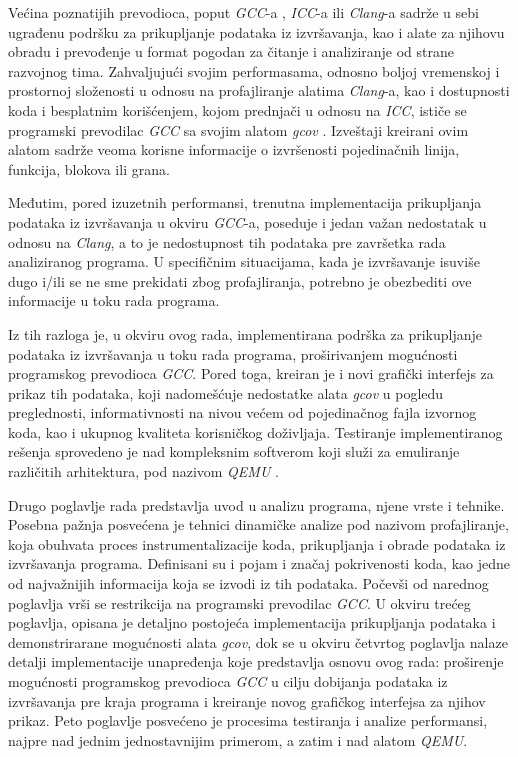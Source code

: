 \documentclass[12pt,oneside]{memoir}
\newcommand{\strano}[1]{\textit{#1}}
\begin{document}
Većina poznatijih prevodioca, poput \strano{GCC}-a \cite{GCC}, \strano{ICC}-a \cite{ICC} ili \strano{Clang}-a \cite{CLANG} sadrže u sebi ugrađenu podršku za prikupljanje podataka iz izvršavanja, kao i alate za njihovu obradu i prevođenje u format pogodan za čitanje i analiziranje od strane razvojnog tima. Zahvaljujući svojim performasama, odnosno boljoj vremenskoj i prostornoj složenosti u odnosu na profajliranje alatima \strano{Clang}-a, kao i dostupnosti koda i besplatnim korišćenjem, kojom prednjači u odnosu na \strano{ICC}, ističe se programski prevodilac \strano{GCC} sa svojim alatom \strano{gcov} \cite{GCOV}. Izveštaji kreirani ovim alatom sadrže veoma korisne informacije o izvršenosti pojedinačnih linija, funkcija, blokova ili grana. 

Međutim, pored izuzetnih performansi, trenutna implementacija prikupljanja podataka iz izvršavanja u okviru \strano{GCC}-a, poseduje i jedan važan nedostatak u odnosu na \strano{Clang}, a to je nedostupnost tih podataka pre završetka rada analiziranog programa. U specifičnim situacijama, kada je izvršavanje isuviše dugo i/ili se ne sme prekidati zbog profajliranja, potrebno je obezbediti ove informacije u toku rada programa.
 
Iz tih razloga je, u okviru ovog rada, implementirana podrška za prikupljanje podataka iz izvršavanja u toku rada programa, proširivanjem mogućnosti programskog prevodioca \strano{GCC}. Pored toga, kreiran je i novi grafički interfejs za prikaz tih podataka, koji nadomešćuje nedostatke alata \strano{gcov} u pogledu preglednosti, informativnosti na nivou većem od pojedinačnog fajla izvornog koda, kao i ukupnog kvaliteta korisničkog doživljaja. Testiranje implementiranog rešenja sprovedeno je nad kompleksnim softverom koji služi za emuliranje različitih arhitektura, pod nazivom \strano{QEMU} \cite{QEMU}. 

Drugo poglavlje rada predstavlja uvod u analizu programa, njene vrste i tehnike. Posebna pažnja posvećena je tehnici dinamičke analize pod nazivom profajliranje, koja obuhvata proces instrumentalizacije koda, prikupljanja i obrade podataka iz izvršavanja programa. Definisani su i pojam i značaj pokrivenosti koda, kao jedne od najvažnijih informacija koja se izvodi iz tih podataka. Počevši od narednog poglavlja vrši se restrikcija na programski prevodilac \strano{GCC}. U okviru trećeg poglavlja, opisana je detaljno postojeća implementacija prikupljanja podataka i demonstrirarane mogućnosti alata \strano{gcov}, dok se u okviru četvrtog poglavlja nalaze detalji implementacije unapređenja koje predstavlja osnovu ovog rada: proširenje mogućnosti programskog prevodioca \strano{GCC} u cilju dobijanja podataka iz izvršavanja pre kraja programa i kreiranje novog grafičkog interfejsa za njihov prikaz. Peto poglavlje posvećeno je procesima testiranja i analize performansi, najpre nad jednim jednostavnijim primerom, a zatim i nad alatom \strano{QEMU}.
\end{document}
